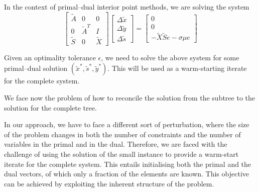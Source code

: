 In the context of primal--dual interior point methods, we are 
solving the system
\[
\left[ \begin{array}{ccc}
    \tilde{A} & 0 & 0 \\
    0 & \tilde{A}^T & I \\
    \tilde{S} & 0 & \tilde{X}
    \end{array} \right]
\left[ \begin{array}{c}
    \Delta\tilde{x} \\ \Delta\tilde{y} \\ \Delta\tilde{s}
\end{array} \right] = 
\left[ \begin{array}{c}
      0 \\ 0 \\ -\tilde{X}\tilde{S}e - \sigma\mu e
\end{array} \right]
\]

Given an optimality tolerance $\epsilon$, we need to solve 
the above system for some primal--dual solution 
$(\tilde{x}^*, \tilde{s}^*, \tilde{y}^*)$. This will be used 
as a warm-starting iterate for the complete system.

We face now the problem of how to reconcile the solution from 
the subtree to the solution for the complete tree.

In our approach, we have to face a different sort of 
perturbation, where the size of the problem changes in both 
the number of constraints and the number of variables in the 
primal and in the dual. Therefore, we are faced with the 
challenge of using the solution of the small instance to 
provide a warm-start iterate for the complete system. This 
entails initialising both the primal and the dual vectors, of 
which only a fraction of the elements are known. This objective 
can be achieved by exploiting the inherent structure of the problem.

